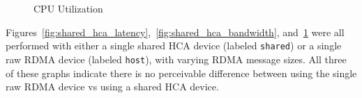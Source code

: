 \documentclass[12pt,titlepage]{article}
\begin{document}
\begin{figure}
	\centering
	\caption{CPU Utilization}%
	\label{fig:shared_hca_cpu}
\end{figure}

Figures~\ref{fig:shared_hca_latency},~\ref{fig:shared_hca_bandwidth}, and~\ref{fig:shared_hca_cpu} were all performed with either a single shared HCA device (labeled \texttt{shared}) or a single raw RDMA device (labeled \texttt{host}), with varying RDMA message sizes.
All three of these graphs indicate there is no perceivable difference between using the single raw RDMA device vs using a shared HCA device.
\end{document}
